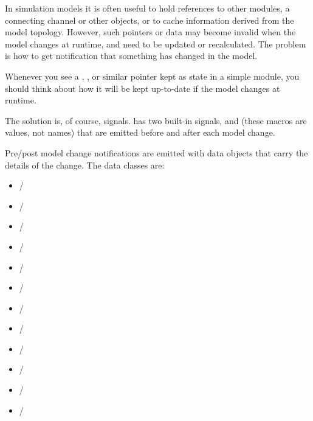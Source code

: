 In simulation models it is often useful to hold references to other
modules, a connecting channel or other objects, or to cache information
derived from the model topology. However, such pointers or data may
become invalid when the model changes at runtime, and need to be updated
or recalculated. The problem is how to get notification that something has
changed in the model.

\begin{note}
  Whenever you see a , ,  or
  similar pointer kept as state in a simple module, you should think about
  how it will be kept up-to-date if the model changes at runtime.
\end{note}

The solution is, of course, signals. {\opp} has two built-in signals,
 and  (these macros
are  values, not names) that are emitted before and
after each model change.

Pre/post model change notifications are emitted with data objects that
carry the details of the change. The data classes are:

\begin{itemize}
  \item {} / 
  \item {} / 
  \item {} / 
  \item {} / 
  \item {} / 
  \item {} / 
  \item {} / 
  \item {} / 
  \item {} / 
  \item {} / 
  \item {} / 
  \item {} / 
\end{itemize}

